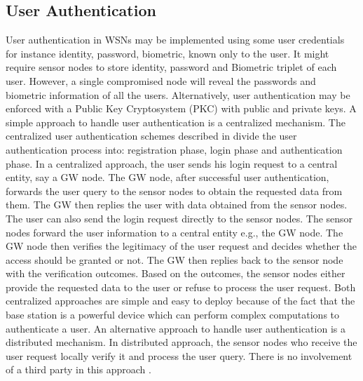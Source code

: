 \documentclass[a4paper,12pt]{report}
\begin{document}
\subsection{User Authentication}
User authentication in WSNs may be implemented using some user
credentials for instance identity, password, biometric, known only
to the user. It might require sensor nodes to store identity,
password and Biometric triplet of each user. However, a single
compromised node will reveal the passwords and biometric information
of all the users. Alternatively, user authentication may be enforced
with a Public Key Cryptosystem (PKC) with public and private keys. A
simple approach to handle user authentication is a centralized
mechanism. The centralized user authentication schemes described in
\cite{wong,tseng,das2009,lee2008} divide the user authentication
process into: registration phase, login phase and authentication
phase. In a centralized approach, the user sends his login request
to a central entity, say a GW node. The GW node, after successful
user authentication, forwards the user query to the sensor nodes to
obtain the requested data from them. The GW then replies the user
with data obtained from the sensor nodes. The user can also send the
login request directly to the sensor nodes. The sensor nodes forward
the user information to a central entity e.g., the GW node. The GW
node then verifies the legitimacy of the user request and decides
whether the access should be granted or not. The GW then replies
back to the sensor node with the verification outcomes. Based on the
outcomes, the sensor nodes either provide the requested data to the
user or refuse to process the user request. Both centralized
approaches are simple and easy to deploy because of the fact that
the base station is a powerful device which can perform complex
computations to authenticate a user. An alternative approach to
handle user authentication is a distributed mechanism. In
distributed approach, the sensor nodes who receive the user request
locally verify it and process the user query. There is no
involvement of a third party in this approach \cite{yasmin}.\\
\end{document}
